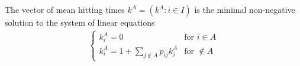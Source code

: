 \begin{thm}[Theorem 1.3.5]
The vector of mean hitting times \(k^A=(k^A:i\in I)\) is the minimal non-negative solution to the system of linear equations
\begin{align*}
\begin{cases}k_{i}^A=0 &\text{for }i\in A \\ k_{i}^A=1+\sum _{j\not\in A}p_{ij}k_{j}^A &\text{for }\not\in A\end{cases}
\end{align*}
\end{thm}

